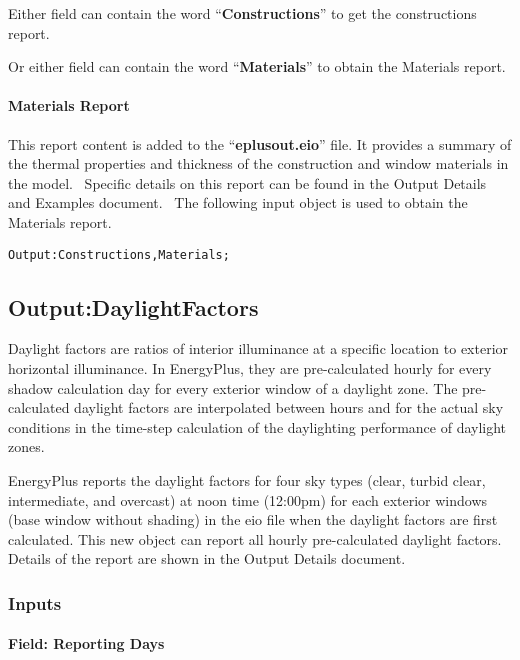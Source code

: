 Either field can contain the word ``\textbf{Constructions}'' to get the constructions report.

Or either field can contain the word ``\textbf{Materials}'' to obtain the Materials report.

\paragraph{Materials Report}\label{materials-report}

This report content is added to the ``\textbf{eplusout.eio}'' file. It provides a summary of the thermal properties and thickness of the construction and window materials in the model.~ Specific details on this report can be found in the Output Details and Examples document.~ The following input object is used to obtain the Materials report.

\begin{lstlisting}
Output:Constructions,Materials;
\end{lstlisting}

\subsection{Output:DaylightFactors}\label{outputdaylightfactors}

Daylight factors are ratios of interior illuminance at a specific location to exterior horizontal illuminance. In EnergyPlus, they are pre-calculated hourly for every shadow calculation day for every exterior window of a daylight zone. The pre-calculated daylight factors are interpolated between hours and for the actual sky conditions in the time-step calculation of the daylighting performance of daylight zones.

EnergyPlus reports the daylight factors for four sky types (clear, turbid clear, intermediate, and overcast) at noon time (12:00pm) for each exterior windows (base window without shading) in the eio file when the daylight factors are first calculated. This new object can report all hourly pre-calculated daylight factors. Details of the report are shown in the Output Details document.

\subsubsection{Inputs}\label{inputs-4-027}

\paragraph{Field: Reporting Days}\label{field-reporting-days}

